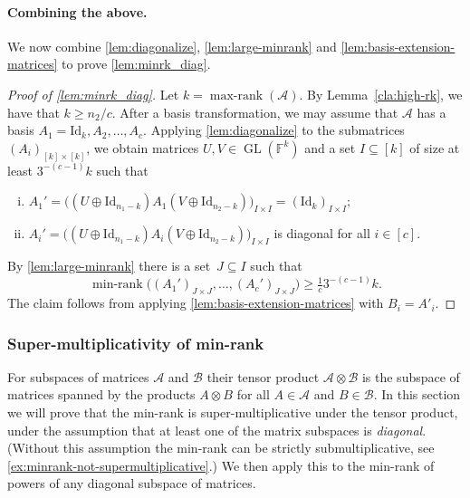\documentclass{daj}
\newcommand{\FF}{\mathbb{F}}
\DeclareMathOperator{\GL}{GL}
\DeclareMathOperator{\maxrank}{max-rank}
\DeclareMathOperator{\minrnk}{min-rank}
\DeclareMathOperator{\maxsupp}{max-supp}
\newcommand{\id}{\mathrm{Id}}
\newcommand{\beqn}{\begin{equation*}}
\newcommand{\eeqn}{\end{equation*}}
\begin{document}
\paragraph{Combining the above.} \!We now combine \autoref{lem:diagonalize}, \autoref{lem:large-minrank} and \autoref{lem:basis-extension-matrices} to prove \autoref{lem:minrk_diag}.

\begin{proof}[Proof of \autoref{lem:minrk_diag}]
Let $k = \maxrank(\mathcal A)$.
    By Lemma~\ref{cla:high-rk}, we have that $k \geq n_2/c$.
    After a basis transformation, we may assume that $\mathcal A$ has a basis $A_1 = \id_k,A_2,\dots,A_c$.
    Applying \autoref{lem:diagonalize} to the submatrices $(A_i)_{[k]\times [k]}$, we obtain matrices $U,V\in \GL(\FF^k)$ and a set $I\subseteq[k]$ of size at least $3^{-(c-1)}k$ such that
    \begin{enumerate}[(i)]
        \item $A_1' = \big((U\oplus \id_{n_1 - k})A_1(V\oplus \id_{n_2 - k})\big)_{I\times I} = (\id_k)_{I\times I}$;
    \item $A_i' = \big((U\oplus \id_{n_1 - k})A_i(V\oplus \id_{n_2 - k})\big)_{I\times I}$ is diagonal for all $i\in [c]$.
    \end{enumerate}
    By \autoref{lem:large-minrank} there is a set~$J\subseteq I$ such that
    \beqn
    \minrnk\big((A_1')_{J\times J},\dots,(A_c')_{J\times J}\big) \geq \tfrac{1}{c} 3^{-(c-1)}k. %
    \eeqn
    The claim follows from applying \autoref{lem:basis-extension-matrices} with $B_i = A'_i$.
\end{proof}

\subsubsection{Super-multiplicativity of min-rank}\label{subsec:supermult}

For subspaces of matrices $\mathcal{A}$ and $\mathcal{B}$ their tensor product $\mathcal{A} \otimes \mathcal{B}$ is the subspace of matrices spanned by the products $A \otimes B$ for all $A \in \mathcal{A}$ and $B \in \mathcal{B}$.
In this section we will prove that the min-rank is super-multiplicative under the tensor product, under the assumption that at least one of the matrix subspaces is \emph{diagonal}. (Without this assumption the min-rank can be strictly submultiplicative, see \autoref{ex:minrank-not-supermultiplicative}.)
We then apply this to the min-rank of powers of any diagonal subspace of matrices.
\end{document}
